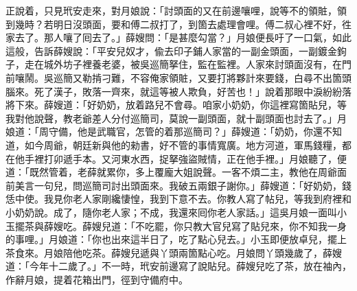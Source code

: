 正說着，只見玳安走來，對月娘說：「討頭面的又在前邊嚷哩，說等不的領賍，領到幾時？若明日沒頭面，要和傅二叔打了，到箇去處理會哩。傅二叔心裡不好，徃家去了。那人嚷了囘去了。」薛嫂問：「是甚麼勾當？」月娘便長吁了一口氣，如此這般，告訴薛嫂說：「平安兒奴才，偸去印子鋪人家當的一副金頭面，一副鍍金鉤子，走在城外坊子裡養老婆，被吳巡簡拏住，監在監裡。人家來討頭面沒有，在門前嚷鬧。吳巡簡又勒掯刁難，不容俺家領賍，又要打將夥計來要錢，白尋不出箇頭腦來。死了漢子，敗落一齊來，就這等被人欺負，好苦也！」說着那眼中淚紛紛落將下來。{}薛嫂道：「好奶奶，放着路兒不會尋。咱家小奶奶，你這裡寫箇貼兒，等我對他說聲，教老爺差人分付巡簡司，莫說一副頭面，就十副頭面也討去了。」月娘道：「周守備，他是武職官，怎管的着那巡簡司？」薛嫂道：「奶奶，你還不知道，如今周爺，朝廷新與他的勑書，好不管的事情寬廣。地方河道，軍馬錢糧，都在他手裡打卯遞手本。又河東水西，捉拏強盜賊情，正在他手裡。」月娘聽了，便道：「既然管着，老薛就累你，多上覆龐大姐說聲。一客不煩二主，教他在周爺面前美言一句兒，問巡簡司討出頭面來。我破五兩銀子謝你。」薛嫂道：「好奶奶，錢恁中使。我見你老人家剛纔悽惶，我到下意不去。你教人寫了帖兒，等我到府裡和小奶奶說。成了，隨你老人家；不成，我還來囘你老人家話。」這吳月娘一面叫小玉擺茶與薛嫂吃。薛嫂兒道：「不吃罷，你只教大官兒寫了貼兒來，你不知我一身的事哩。」月娘道：「你也出來這半日了，吃了點心兒去。」小玉即便放卓兒，擺上茶食來。月娘陪他吃茶。薛嫂兒遞與丫頭兩箇點心吃。月娘問丫頭幾歲了，薛嫂道：「今年十二歲了。」不一時，玳安前邊寫了說貼兒。薛嫂兒吃了茶，放在袖內，作辭月娘，提着花箱出門，徑到守備府中。

